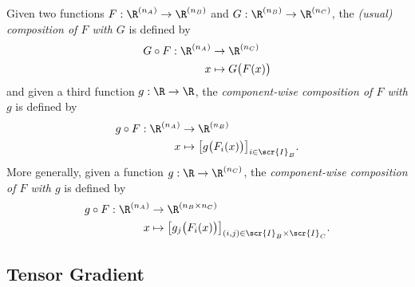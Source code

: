 \documentclass[11pt]{article}
\theoremstyle{remark}
\newtheorem{technical}{Technical note}
\begin{document}
Given two functions $F:\R^{(n_A)}\to\R^{(n_B)}$ and
$G:\R^{(n_B)}\to\R^{(n_C)}$, the \emph{(usual) composition of $F$ with
  $G$} is defined by
\begin{align*}
  G \circ F:\R^{(n_A)}&\to\R^{(n_C)}\\
  x&\mapsto G\big(F(x)\big)
\end{align*}
and given a third function $g:\R\to\R$, the \emph{component-wise
  composition of $F$ with $g$} is defined by
\begin{align*}
  g\circ F:\R^{(n_A)}&\to\R^{(n_B)}\\
  x&\mapsto \big[g\big(F_i(x)\big)\big]_{i\in \scr{I}_B}.
\end{align*}
More generally, given a function $g:\R\to\R^{(n_C)}$, the
\emph{component-wise composition of $F$ with $g$} is defined by
\begin{align*}
  g\circ F:\R^{(n_A)}&\to\R^{(n_B\times n_C)}\\
  x&\mapsto \big[g_j\big(F_i(x)\big)\big]_{(i,j)\in \scr{I}_B\times\scr{I}_C}.
\end{align*}


\subsection{Tensor Gradient}
\end{document}
